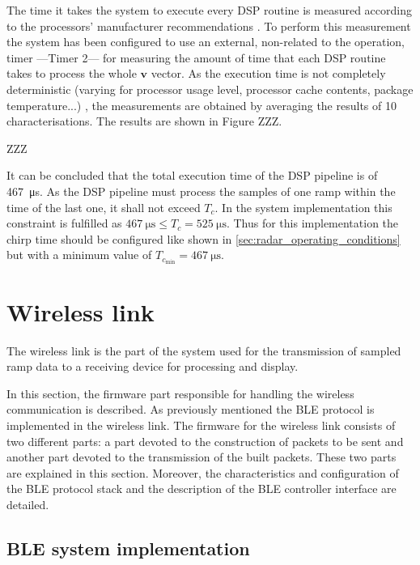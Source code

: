 The time it takes the system to execute every DSP routine is measured according to the processors' manufacturer recommendations \cite{ARM2020}. To perform this measurement the system has been configured to use an external, non-related to the operation, timer ---Timer 2--- for measuring the amount of time that each DSP routine takes to process the whole $\mathbf{v}$ vector. As the execution time is not completely deterministic (varying for processor usage level, processor cache contents, package temperature...) \cite{ARM2020} %
, the measurements are obtained by averaging the results of 10 characterisations. The results are shown in Figure ZZZ.

ZZZ

It can be concluded that the total execution time of the DSP pipeline is of \SI{467}{\micro\second}. As the DSP pipeline must process the samples of one ramp within the time of the last one, it shall not exceed $T_c$. In the system implementation this constraint is fulfilled as $\SI{467}{\micro\second} \le T_c = \SI{525}{\micro\second}$. Thus for this implementation the chirp time should be configured like shown in \cref{sec:radar_operating_conditions} but with a minimum value of $T_{c_{\min}} = \SI{467}{\micro\second}$.

\section{Wireless link} \label{sec:wireless_link}

The wireless link is the part of the system used for the transmission of sampled ramp data to a receiving device for processing and display.

In this section, the firmware part responsible for handling the wireless communication is described. As previously mentioned the BLE protocol is implemented in the wireless link. The firmware for the wireless link consists of two different parts: a part devoted to the construction of packets to be sent and another part devoted to the transmission of the built packets. These two parts are explained in this section. Moreover, the characteristics and configuration of the BLE protocol stack and the description of the BLE controller interface are detailed.

\subsection{BLE system implementation}


